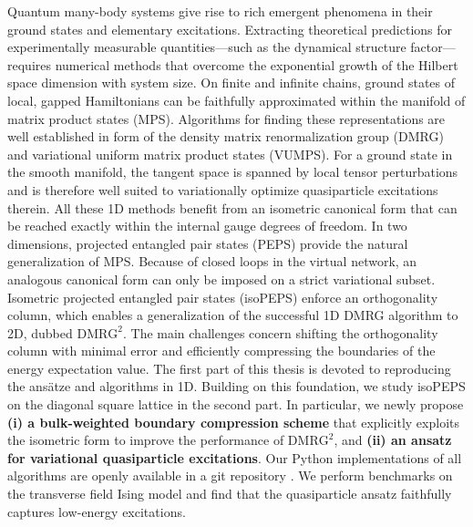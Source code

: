 Quantum many-body systems give rise to rich emergent phenomena in their ground states and elementary excitations. Extracting theoretical predictions for experimentally measurable quantities---such as the dynamical structure factor---requires numerical methods that overcome the exponential growth of the Hilbert space dimension with system size. On finite and infinite chains, ground states of local, gapped Hamiltonians can be faithfully approximated within the manifold of matrix product states (MPS). Algorithms for finding these representations are well established in form of the density matrix renormalization group (DMRG) and variational uniform matrix product states (VUMPS). For a ground state in the smooth manifold, the tangent space is spanned by local tensor perturbations and is therefore well suited to variationally optimize quasiparticle excitations therein. All these 1D methods benefit from an isometric canonical form that can be reached exactly within the internal gauge degrees of freedom. 
In two dimensions, projected entangled pair states (PEPS) provide the natural generalization of MPS. Because of closed loops in the virtual network, an analogous canonical form can only be imposed on a strict variational subset. Isometric projected entangled pair states (isoPEPS) enforce an orthogonality column, which enables a generalization of the successful 1D DMRG algorithm to 2D, dubbed $\text{DMRG}^2$. The main challenges concern shifting the orthogonality column with minimal error and efficiently compressing the boundaries of the energy expectation value. 
The first part of this thesis is devoted to reproducing the ansätze and algorithms in 1D. Building on this foundation, we study isoPEPS on the diagonal square lattice in the second part. In particular, we newly propose \textbf{(i) a bulk-weighted boundary compression scheme} that explicitly exploits the isometric form to improve the performance of $\text{DMRG}^2$, and \textbf{(ii) an ansatz for variational quasiparticle excitations}. Our Python implementations of all algorithms are openly available in a git repository \cite{wittmann2025iso}. We perform benchmarks on the transverse field Ising model and find that the quasiparticle ansatz faithfully captures low-energy excitations.